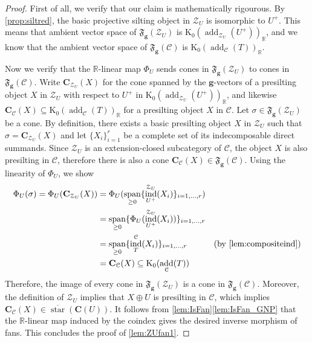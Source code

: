 \documentclass[10pt,twoside, a4paper,reqno]{amsart}
\DeclareMathOperator{\add}{add}
\DeclareMathOperator{\spann}{span}
\DeclareMathOperator{\ind}{ind}
\DeclareMathOperator{\starr}{star}
\newcommand{\partfan}[1]{\mathfrak{F}_{\bfg}(#1)}
\newcommand{\R}{\mathbb{R}}
\newcommand{\calC}{\mathcal{C}}
\newcommand{\calZ}{\mathcal{Z}}
\newcommand{\boldC}{\mathbf{C}}
\newcommand{\K}{\mathrm{K}}
\newcommand{\bfg}{\mathbf{g}}
\theoremstyle{definition}
\begin{document}
\begin{proof}
	First of all, we verify that our claim is mathematically rigourous. By \cref{prop:siltred}, the basic projective silting object in $\calZ_U$ is isomorphic to $U^+$. This means that ambient vector space of $\partfan{\calZ_U}$ is $\K_0(\add_{\calZ_U} (U^+))_\R$, and we know that the ambient vector space of $\partfan{\calC}$ is $\K_0(\add_{{\calC}}(T))_\R$. 
	
	Now we verify that the $\R$-linear map $\Phi_U$ sends cones in $\partfan{\calZ_U}$ to cones in $\partfan{\calC}$. Write $\boldC_{\calZ_U}(X)$ for the cone spanned by the $\bfg$-vectors of a presilting object $X$ in $\calZ_U$ with respect to $U^+$ in ${\K}_0(\add_{\calZ_U}(U^+))_\R$, and likewise $\boldC_{\calC}(X) \subseteq \K_0(\add_{\calC}(T))_\R$ for a presilting object $X$ in $\calC$.
	Let $\sigma \in \partfan{\calZ_U}$ be a cone. By definition, there exists a basic presilting object $X$ in $\calZ_U$ such that $\sigma = \boldC_{\calZ_U}(X)$ and let $\{ X_i\}_{i=1}^r$ be a complete set of its indecomposable direct summands. Since $\calZ_U$ is an extension-closed subcategory of $\calC$, the object $X$ is also presilting in $\calC$, therefore there is also a cone $\boldC_{\calC}(X) \in \partfan{\calC}$. Using the linearity of $\Phi_U$, we show
	\begin{align*}
	\Phi_U(\sigma) = \Phi_U(\boldC_{\calZ_U}(X)) &= \Phi_U( \spann_{\geq 0} \{ \ind_{U^+}^{\calZ_U}(X_i) \}_{i =1, \dots, r}) \\
	&= \spann_{\geq 0} \{ \Phi_U(\ind_{U^+}^{\calZ_U} (X_i)) \}_{i=1, \dots, r} \\
	&=  \spann_{\geq 0} \{ \ind_{T}^{\calC} (X_i) \}_{i=1, \dots, r} & \text{(by \cref{lem:compositeind})} \\
	&= \boldC_{\calC}(X) \subseteq \K_0(\add_{\calC}(T)) 
	 \end{align*}
	Therefore, the image of every cone in $\partfan{\calZ_U}$ is a cone {in} $\partfan{\calC}$. Moreover, the definition of $\calZ_U$ implies that $X \oplus U$ is presilting in $\calC$, which implies $\boldC_{\calC}(X) \in \overline{\starr}(\boldC(U))$. It follows from \cref{lem:IsFan}\eqref{lem:IsFan_GNP} that the $\R$-linear map induced by the coindex gives the desired inverse morphism of fans. This concludes the proof of \eqref{lem:ZUfan1}.
	

\end{proof}
\end{document}
